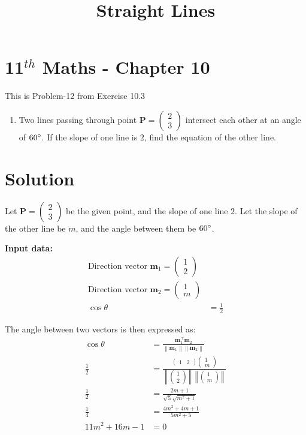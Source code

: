 \documentclass[10pt]{article}
\newcommand{\myvec}[1]{\ensuremath{\begin{pmatrix}#1\end{pmatrix}}}
\let\vec\mathbf
\providecommand{\norm}[1]{\left\lVert#1\right\rVert}
\let\vec\mathbf
\renewcommand{\vec}[1]{\textbf{#1}}
\begin{document}
\title{\textbf{Straight Lines}}
\date{\vspace{-5ex}}
\maketitle

\section*{11$^{th}$ Maths - Chapter 10}
This is Problem-12 from Exercise 10.3

\begin{enumerate}
\item Two lines passing through point $\vec{P} = \myvec{2\\3}$ intersect each other at an angle of $60\degree$. If the slope of one line is $2$, find the equation of the other line.
\end{enumerate}

\section{Solution}

Let $\vec{P} = \myvec{ 2 \\ 3 }$ be the given point, and the slope of one line $2$. Let the slope of the other line be $m$, and the angle between them be $60\degree$.

\textbf{Input data:}
\begin{align}
\text{Direction vector } \vec{m}_1 =  \myvec{1 \\ 2}  \\
\text{Direction vector } \vec{m}_2 =  \myvec{1 \\ m}  \\
\cos \theta &= \frac{1}{2}
\end{align}

The angle between two vectors is then expressed as:
\begin{align}
\cos \theta &= \frac{\vec{m}_1^\top \vec{m}_2}{\norm{\vec{m}_1}\norm{\vec{m}_2}} \\
\frac{1}{2} &= \frac{\myvec{ 1 & 2} \myvec{ 1 \\ m} }{\norm{\myvec{ 1 \\ 2 }}\norm{\myvec{1 \\ m } }}\\
\frac{1}{2} &= \frac{2m + 1}{\sqrt{5} \sqrt{m^2 + 1}} \\
\frac{1}{4} &= \frac{4m^2 + 4m + 1}{5m^2 + 5} \\
11m^2 + 16m - 1 &= 0
\end{align}
\end{document}
